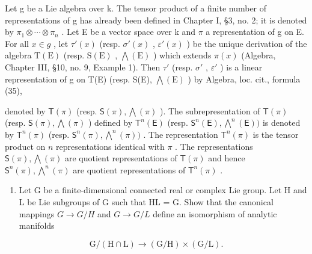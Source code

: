 Let g be a Lie algebra over k. The tensor product of a finite number of representations of g has already been defined in Chapter I, §3, no. 2; it is denoted by \(\pi_{1}\otimes\cdots\otimes\pi_{n}\) . Let E be a vector space over k and \(\pi\) a representation of g on E. For all \(x\in g\) , let \(\tau'(x)\) (resp. \(\sigma'(x)\) , \(\varepsilon'(x)\) ) be the unique derivation of the algebra \(\mathrm{T(E)}\) (resp. \(\mathrm{S(E)}\) , \(\bigwedge(\mathrm{E})\) ) which extends \(\pi(x)\) (Algebra, Chapter III, §10, no. 9, Example 1). Then \(\tau'\) (resp. \(\sigma'\) , \(\varepsilon'\) ) is a linear representation of g on T(E) (resp. S(E), \(\bigwedge(\mathrm{E})\) ) by Algebra, loc. cit., formula (35),

denoted by \(\mathsf{T}(\pi)\) (resp. \(\mathsf{S}(\pi),\bigwedge (\pi)\) ). The subrepresentation of \(\mathsf{T}(\pi)\) (resp. \(\mathsf{S}(\pi),\bigwedge (\pi)\) ) defined by \(\mathsf{T}^n (\mathsf{E})\) (resp. \(\mathsf{S}^n (\mathsf{E}),\bigwedge^n (\mathsf{E}))\) is denoted by \(\mathsf{T}^n (\pi)\) (resp. \(\mathsf{S}^n (\pi),\bigwedge^n (\pi))\) . The representation \(\mathsf{T}^n (\pi)\) is the tensor product on \(n\) representations identical with \(\pi\) . The representations \(\mathsf{S}(\pi),\bigwedge (\pi)\) are quotient representations of \(\mathsf{T}(\pi)\) and hence \(\mathsf{S}^n (\pi),\bigwedge^n (\pi)\) are quotient representations of \(\mathsf{T}^n (\pi)\) .



\begin{enumerate}
\def\labelenumi{\arabic{enumi}.}
\tightlist
\item
  Let G be a finite-dimensional connected real or complex Lie group. Let H and L be Lie subgroups of G such that HL = G. Show that the canonical mappings \(G \rightarrow G/H\) and \(G \rightarrow G/L\) define an isomorphism of analytic manifolds
\end{enumerate}

\[
\mathrm{G} / (\mathrm{H} \cap \mathrm{L}) \rightarrow (\mathrm{G} / \mathrm{H}) \times (\mathrm{G} / \mathrm{L}).
\]

